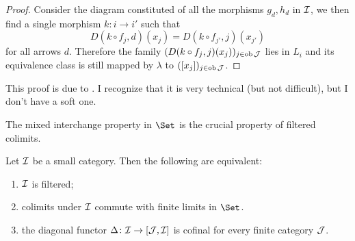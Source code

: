 \begin{proof}
    Consider the diagram constituted of all the morphisms $g_d,h_d$ in ${\cal I}$, we then find a single morphism $k\colon i\to i'$ such that
    \begin{equation*}
      D(k\circ f_j,d)(x_j) = D(k\circ f_{j'},j)(x_{j'})
    \end{equation*}
    for all arrows $d$. Therefore the family $(D(k\circ f_j,j)(x_j))_{j\in\operatorname{ob}{\cal J}}$ lies in $L_i$ and its equivalence class is still mapped by $\lambda$ to $([x_j])_{j\in\operatorname{ob}{\cal J}}$.
  \end{proof}
  \begin{rem}
    This proof is due to \cite{borceux}. I recognize that it is very technical (but not difficult), but I don't have a soft one.
  \end{rem}

  The mixed interchange property in $\Set$ is the crucial property of filtered colimits.
  \begin{prop}\label{prop:filtered category 2}
    Let ${\cal I}$ be a small category. Then the following are equivalent:
    \begin{enumerate}
      \item ${\cal I}$ is filtered;
      \item colimits under ${\cal I}$ commute with finite limits in $\Set$.
      \item the diagonal functor $\Delta\colon{\cal I}\to[{\cal J},{\cal I}]$ is cofinal for every finite category ${\cal J}$.
    \end{enumerate}
  \end{prop}
